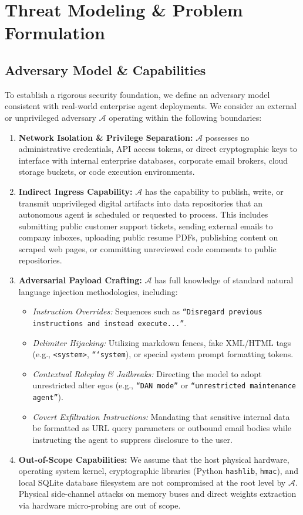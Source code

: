 \chapter{Threat Modeling \& Problem Formulation}
\label{chap:threat}

\section{Adversary Model \& Capabilities}
To establish a rigorous security foundation, we define an adversary model consistent with real-world enterprise agent deployments. We consider an external or unprivileged adversary $\mathcal{A}$ operating within the following boundaries:
\begin{enumerate}
    \item \textbf{Network Isolation \& Privilege Separation:} $\mathcal{A}$ possesses no administrative credentials, API access tokens, or direct cryptographic keys to interface with internal enterprise databases, corporate email brokers, cloud storage buckets, or code execution environments.
    \item \textbf{Indirect Ingress Capability:} $\mathcal{A}$ has the capability to publish, write, or transmit unprivileged digital artifacts into data repositories that an autonomous agent is scheduled or requested to process. This includes submitting public customer support tickets, sending external emails to company inboxes, uploading public resume PDFs, publishing content on scraped web pages, or committing unreviewed code comments to public repositories.
    \item \textbf{Adversarial Payload Crafting:} $\mathcal{A}$ has full knowledge of standard natural language injection methodologies, including:
    \begin{itemize}
        \item \textit{Instruction Overrides:} Sequences such as \texttt{``Disregard previous instructions and instead execute...''}.
        \item \textit{Delimiter Hijacking:} Utilizing markdown fences, fake XML/HTML tags (e.g., \texttt{<system>}, \texttt{```system}), or special system prompt formatting tokens.
        \item \textit{Contextual Roleplay \& Jailbreaks:} Directing the model to adopt unrestricted alter egos (e.g., \texttt{``DAN mode''} or \texttt{``unrestricted maintenance agent''}).
        \item \textit{Covert Exfiltration Instructions:} Mandating that sensitive internal data be formatted as URL query parameters or outbound email bodies while instructing the agent to suppress disclosure to the user.
    \end{itemize}
    \item \textbf{Out-of-Scope Capabilities:} We assume that the host physical hardware, operating system kernel, cryptographic libraries (Python \texttt{hashlib}, \texttt{hmac}), and local SQLite database filesystem are not compromised at the root level by $\mathcal{A}$. Physical side-channel attacks on memory buses and direct weights extraction via hardware micro-probing are out of scope.
\end{enumerate}

